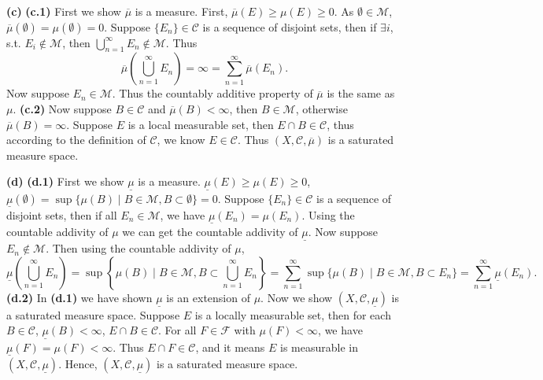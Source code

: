 \documentclass{article}%
\begin{document}
\begin{enumerate}
\textbf{(c)} \textbf{(c.1)} First we show $\overline\mu$ is a measure. First, $\overline\mu(E) \ge \mu(E)\ge 0$. As $\emptyset\in\mathcal{M}$, $\overline\mu(\emptyset) = \mu(\emptyset) = 0$. Suppose $\{E_n\}\in\mathcal{C}$ is a sequence of disjoint sets, then if $\exists i$, s.t. $E_i\notin\mathcal{M}$, then $\bigcup\limits_{n=1}^{\infty}E_n \notin\mathcal{M}$. Thus
$$
\overline\mu\left(\bigcup\limits_{n=1}^{\infty}E_n\right) = \infty = \sum_{n=1}^{\infty}\overline\mu(E_n).
$$
Now suppose $E_n\in\mathcal{M}$. Thus the countably additive property of $\overline\mu$ is the same as $\mu$.
\textbf{(c.2)} Now suppose $B\in\mathcal{C}$ and $\overline\mu(B)< \infty$, then $B\in\mathcal{M}$, otherwise $\overline\mu(B) = \infty$. Suppose $E$ is a local measurable set, then $E\cap B\in\mathcal{C}$, thus according to the definition of $\mathcal{C}$, we know $E\in\mathcal{C}$. Thus $(X, \mathcal{C}, \overline\mu)$ is a saturated measure space.

\textbf{(d)} \textbf{(d.1)} First we show $\underline{\mu}$ is a measure. $\underline{\mu}(E) \ge\mu(E)\ge 0$, $\underline{\mu}(\emptyset) = \sup\{\mu(B)\mid B\in\mathcal{M}, B\subset\emptyset\} = 0$. Suppose $\{E_n\}\in\mathcal{C}$ is a sequence of disjoint sets, then if all $E_n\in\mathcal{M}$, we have $\underline{\mu}(E_n) = \mu(E_n)$. Using the countable addivity of $\mu$ we can get the countable addivity of $\underline{\mu}$. Now suppose $E_n\notin\mathcal{M}$. Then using the countable addivity of $\mu$,
$$
\underline{\mu}\left(\bigcup_{n=1}^{\infty}E_n \right) = \sup\left\{\mu(B)\mid B\in\mathcal{M}, B\subset\bigcup_{n=1}^{\infty}E_n\right\} = \sum_{n=1}^{\infty} \sup\{\mu(B)\mid B\in\mathcal{M}, B\subset E_n\} = \sum_{n=1}^{\infty}\underline{\mu}(E_n).
$$
\textbf{(d.2)} In \textbf{(d.1)} we have shown $\underline{\mu}$ is an extension of $\mu$. Now we show $(X, \mathcal{C}, \underline{\mu})$ is a saturated measure space. Suppose $E$ is a locally measurable set, then for each $B\in\mathcal{C}$, $\underline\mu(B) < \infty$, $E\cap B\in\mathcal{C}$. For all $F\in\mathcal{F}$ with $\mu(F) < \infty$, we have $\underline{\mu}(F) = \mu(F) < \infty$. Thus $E\cap F\in\mathcal{C}$, and it means $E$ is measurable in $(X, \mathcal{C}, \underline{\mu})$. Hence, $(X, \mathcal{C}, \underline{\mu})$ is a saturated measure space.

\bigskip




\end{enumerate}
\end{document}
